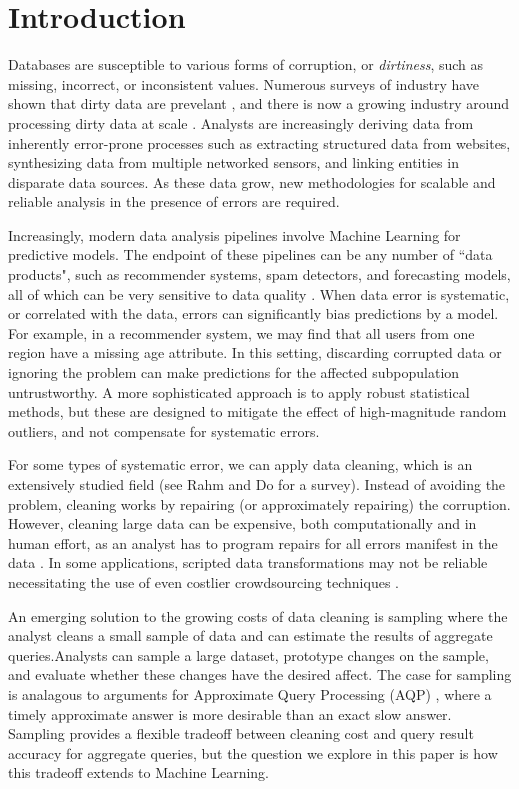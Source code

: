 \section{Introduction}
Databases are susceptible to various forms of corruption, or \emph{dirtiness}, such as missing, incorrect, or inconsistent values.
Numerous surveys of industry have shown that dirty data are prevelant \cite{Gartner}, and there is now a growing industry around processing dirty data at scale \cite{fortunearticle}.
Analysts are increasingly deriving data from inherently error-prone processes such as extracting structured data from websites, synthesizing data from multiple networked sensors, and linking entities in disparate data sources.
As these data grow, new methodologies for scalable and reliable analysis in the presence of errors are required. 

Increasingly, modern data analysis pipelines involve Machine Learning for predictive models.
The endpoint of these pipelines can be any number of ``data products", such as recommender systems, spam detectors, and forecasting models, all of which can be very sensitive to data quality \cite{xiaofeature}.
When data error is systematic, or correlated with the data, errors can significantly bias predictions by a model.
For example, in a recommender system, we may find that all users from one region have a missing age attribute.
In this setting, discarding corrupted data or ignoring the problem can make predictions for the affected subpopulation untrustworthy.
A more sophisticated approach is to apply robust statistical methods, but these are designed to mitigate the effect of high-magnitude random outliers, and not compensate for systematic errors.

For some types of systematic error, we can apply data cleaning, which is an extensively studied field (see Rahm and Do \cite{rahm2000data} for a survey).
Instead of avoiding the problem, cleaning works by repairing (or approximately repairing) the corruption.
However, cleaning large data can be expensive, both computationally and in human effort, as an analyst has to program repairs for all errors manifest in the data \cite{kandel2012}.
In some applications, scripted data transformations may not be reliable necessitating the use of even costlier crowdsourcing techniques \cite{gokhale2014corleone,park2014crowdfill}.

An emerging solution to the growing costs of data cleaning is sampling \cite{wang1999sample} where the analyst cleans a small sample of data and can estimate the results of aggregate queries.Analysts can sample a large dataset, prototype changes on the sample, and evaluate whether these changes have the desired affect.
The case for sampling is analagous to arguments for Approximate Query Processing (AQP) \cite{DBLP:conf/eurosys/AgarwalMPMMS13}, where a timely approximate answer is more desirable than an exact slow answer.
Sampling provides a flexible tradeoff between cleaning cost and query result accuracy for aggregate queries, but the question we explore in this paper is how this tradeoff extends to Machine Learning. 

